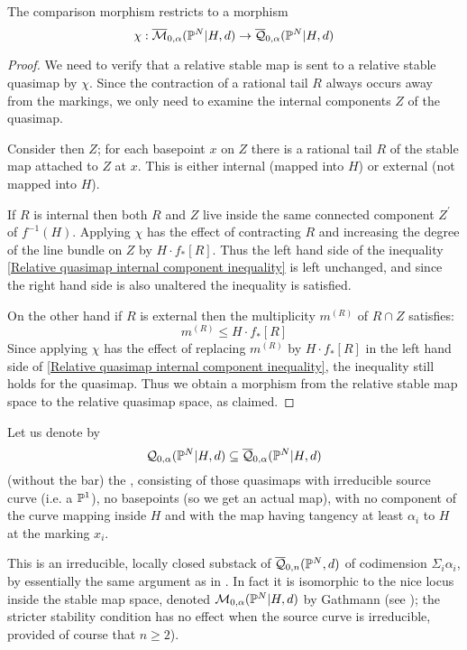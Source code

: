 \begin{lem}\label{lem:comparison}
The comparison morphism restricts to a morphism 
\begin{equation*} \chi: \overline{\mathcal M}_{0,\alpha}(\mathbb P^N|H,d)\rightarrow \overline{\mathcal Q}_{0,\alpha}(\mathbb P^N|H,d) \end{equation*}
\end{lem}
\begin{proof}
We need to verify that a relative stable map is sent to a relative stable quasimap by $\chi$. Since the contraction of a rational tail $R$ always occurs away from the markings, we only need to examine the internal components $Z$ of the quasimap.

Consider then $Z$; for each basepoint $x$ on $Z$ there is a rational tail $R$ of the stable map attached to $Z$ at $x$. This is either internal (mapped into $H$) or external (not mapped into $H$).

If $R$ is internal then both $R$ and $Z$ live inside the same connected component $Z^\prime$ of $f^{-1}(H)$. Applying $\chi$ has the effect of contracting $R$ and increasing the degree of the line bundle on $Z$ by $H \cdot f_* [R]$. Thus the left hand side of the inequality \eqref{Relative quasimap internal component inequality} is left unchanged, and since the right hand side is also unaltered the inequality is satisfied.

On the other hand if $R$ is external then the multiplicity $m^{(R)}$ of $R \cap Z$ satisfies:
\begin{equation*} m^{(R)} \leq H \cdot f_* [R] \end{equation*}
Since applying $\chi$ has the effect of replacing $m^{(R)}$ by $H \cdot f_* [R]$ in the left hand side of \eqref{Relative quasimap internal component inequality}, the inequality still holds for the quasimap. Thus we obtain a morphism from the relative stable map space to the relative quasimap space, as claimed.
\end{proof}
Let us denote by
\begin{equation*} \mathcal Q_{0,\alpha}(\mathbb P^N|H,d) \subseteq \overline{\mathcal Q}_{0,\alpha}(\mathbb P^N|H,d) \end{equation*}
(without the bar) the , consisting of those quasimaps with irreducible source curve (i.e. a $\mathbb P^1$), no basepoints (so we get an actual map), with no component of the curve mapping inside $H$ and with the map having tangency at least $\alpha_i$ to $H$ at the marking $x_i$.

This is an irreducible, locally closed substack of $\overline{\mathcal Q}_{0,n}(\mathbb P^N,d)$ of codimension $\Sigma_i \alpha_i$, by essentially the same argument as in \cite[Lemma 1.8]{Ga}. In fact it is isomorphic to the nice locus inside the stable map space, denoted $\mathcal M_{0,\alpha}(\mathbb P^N|H,d)$ by Gathmann (see \cite[Def. 1.6]{Ga}); the stricter stability condition has no effect when the source curve is irreducible, provided of course that $n\geq2$).


